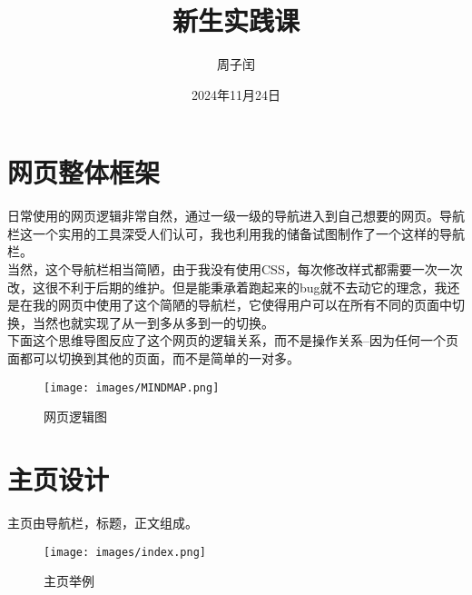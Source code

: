 \documentclass[supercite]{Experimental_Report}
\title{~~~~~~新生实践课~~~~~~}
\author{周子闰}
\date{2024年11月24日}
\theoremstyle{definition}
\begin{document}
\maketitle

\clearpage


\tableofcontents[level=2]

\clearpage


\section{网页整体框架}
日常使用的网页逻辑非常自然，通过一级一级的导航进入到自己想要的网页。导航栏这一个实用的工具深受人们认可，我也利用我的储备试图制作了一个这样的导航栏。\\  当然，这个导航栏相当简陋，由于我没有使用CSS，每次修改样式都需要一次一次改，这很不利于后期的维护。但是能秉承着跑起来的bug就不去动它的理念，我还是在我的网页中使用了这个简陋的导航栏，它使得用户可以在所有不同的页面中切换，当然也就实现了从一到多从多到一的切换。\\  下面这个思维导图反应了这个网页的逻辑关系，而不是操作关系--因为任何一个页面都可以切换到其他的页面，而不是简单的一对多。

\begin{figure}[h]
	\begin{center}
		\texttt{[image: images/MINDMAP.png]}
		\caption{网页逻辑图}
		\label{fig1-1}
	\end{center}
\end{figure}

\newpage

\section{主页设计}

主页由导航栏，标题，正文组成。

\begin{figure}[htb]
	\begin{center}
		\texttt{[image: images/index.png]}
		\caption{主页举例}
		\label{fig2-1}
	\end{center}
\end{figure}
\end{document}
